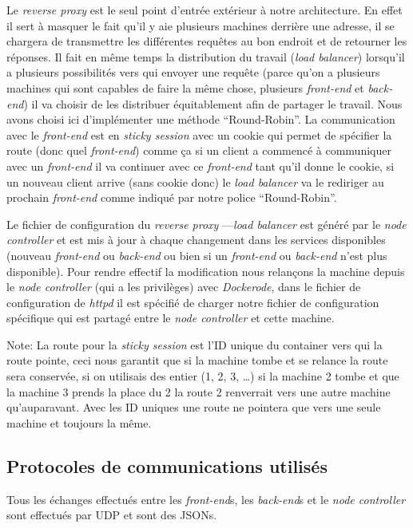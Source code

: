 \documentclass[a4paper,11pt,titlepage]{article}
\begin{document}
Le \emph{reverse proxy} est le seul point d'entrée extérieur à notre architecture. En effet il sert à masquer le fait qu'il y
aie plusieurs machines derrière une adresse, il se chargera de transmettre les différentes requêtes au bon endroit et de
retourner les réponses. Il fait en même temps la distribution du travail (\emph{load balancer}) lorsqu'il a plusieurs
possibilités vers qui envoyer une requête (parce qu'on a plusieurs machines qui sont capables de faire la même chose,
plusieurs \emph{front-end} et \emph{back-end}) il va choisir de les distribuer équitablement afin de partager le travail.
Nous avons choisi ici d'implémenter une méthode ``Round-Robin''. La communication avec le \emph{front-end} est en
\emph{sticky session} avec un cookie qui permet de spécifier la route (donc quel \emph{front-end}) comme ça si un client a
commencé à communiquer avec un \emph{front-end} il va continuer avec ce \emph{front-end} tant qu'il donne le cookie, si un
nouveau client arrive (sans cookie donc) le \emph{load balancer} va le rediriger au prochain \emph{front-end} comme indiqué
par notre police ``Round-Robin''.

Le fichier de configuration du \emph{reverse proxy} ---\emph{load balancer} est généré par le \emph{node controller} et est
mis à jour à chaque changement dans les services disponibles (nouveau \emph{front-end} ou \emph{back-end} ou bien si un
\emph{front-end} ou \emph{back-end} n'est plus disponible). Pour rendre effectif la modification nous relançons la machine
depuis le \emph{node controller} (qui a les privilèges) avec \emph{Dockerode}, dans le fichier de configuration de
\emph{httpd} il est spécifié de charger notre fichier de configuration spécifique qui est partagé entre le \emph{node
controller} et cette machine.

Note: La route pour la \emph{sticky session} est l'ID unique du container vers qui la route pointe, ceci nous garantit que si
la machine tombe et se relance la route sera conservée, si on utilisais des entier (1, 2, 3, \ldots) si la machine 2 tombe et
que la machine 3 prends la place du 2 la route 2 renverrait vers une autre machine qu'auparavant. Avec les ID uniques une
route ne pointera que vers une seule machine et toujours la même.

\subsection{Protocoles de communications utilisés}
Tous les échanges effectués entre les \emph{front-end}s, les \emph{back-end}s et le \emph{node controller} sont effectués par
UDP et sont des JSONs.
\end{document}
